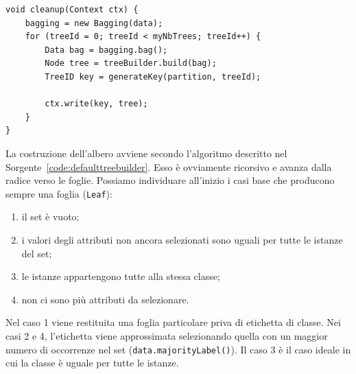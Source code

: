 \documentclass[a4paper,11pt,twoside,openright,fleqn]{book}
\renewcommand{\lstlistingname}{Sorgente}
\newcommand{\code}[1]{\texttt{#1}}
\begin{document}
\begin{lstlisting}[float=htp,caption=Codice della fase di \code{cleanup()}]
void cleanup(Context ctx) {
	bagging = new Bagging(data);
	for (treeId = 0; treeId < myNbTrees; treeId++) {
		Data bag = bagging.bag();
		Node tree = treeBuilder.build(bag);
		TreeID key = generateKey(partition, treeId);
		
		ctx.write(key, tree);
	}
}
\end{lstlisting}

La costruzione dell'albero avviene secondo l'algoritmo descritto nel \lstlistingname\ \ref{code:defaulttreebuilder}. Esso è ovviamente ricorsivo e avanza dalla radice verso le foglie. Possiamo individuare all'inizio i casi base che producono sempre una foglia (\code{Leaf}):
\begin{enumerate}
\item il set è vuoto;
\item i valori degli attributi non ancora selezionati sono uguali per tutte le istanze del set;
\item le istanze appartengono tutte alla stessa classe;
\item non ci sono più attributi da selezionare.
\end{enumerate}

Nel caso 1 viene restituita una foglia particolare priva di etichetta di classe. Nei casi 2 e 4, l'etichetta viene approssimata selezionando quella con un maggior numero di occorrenze nel set (\code{data.majorityLabel()}). Il caso 3 è il caso ideale in cui la classe è uguale per tutte le istanze.
\end{document}
